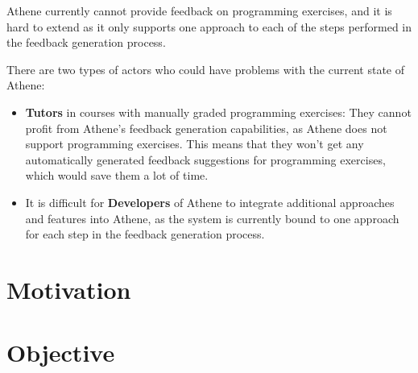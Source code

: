 Athene currently cannot provide feedback on programming exercises, and it is hard to extend as it only supports one approach to each of the steps performed in the feedback generation process.

There are two types of actors who could have problems with the current state of Athene:
\begin{itemize}
    \item \textbf{Tutors} in courses with manually graded programming exercises: They cannot profit from Athene's feedback generation capabilities, as Athene does not support programming exercises. This means that they won't get any automatically generated feedback suggestions for programming exercises, which would save them a lot of time.
    \item It is difficult for \textbf{Developers} of Athene to integrate additional approaches and features into Athene, as the system is currently bound to one approach for each step in the feedback generation process. 
\end{itemize}

\section*{Motivation}
        
\section*{Objective}
        
